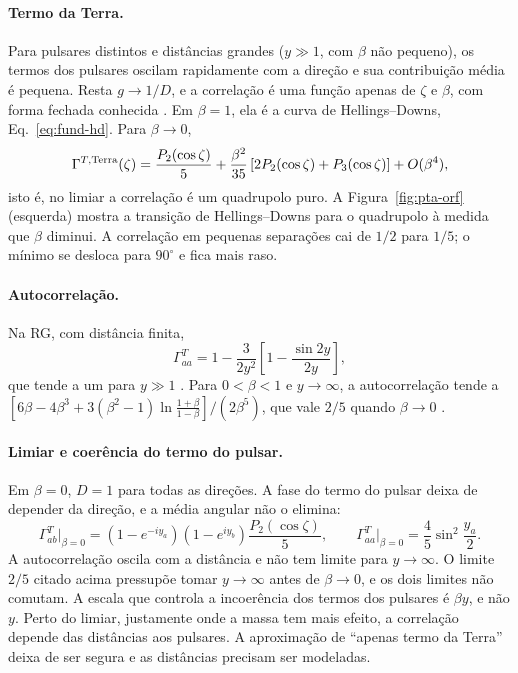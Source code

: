 \paragraph{Termo da Terra.} Para pulsares distintos e distâncias grandes
($y\gg1$, com $\beta$ não pequeno), os termos dos pulsares oscilam
rapidamente com a direção e sua contribuição média é pequena. Resta
$g\to1/D$, e a correlação é uma função apenas de $\zeta$ e $\beta$, com
forma fechada conhecida \autocite{cordes2025,liang2021}. Em $\beta=1$,
ela é a curva de Hellings--Downs, Eq.~\eqref{eq:fund-hd}. Para
$\beta\to0$,
\begin{equation}
 \Gamma^{T,\rm Terra}(\zeta)=\frac{P_2(\cos\zeta)}{5}
 +\frac{\beta^2}{35}\left[2P_2(\cos\zeta)+P_3(\cos\zeta)\right]
 +O(\beta^4),
 \label{eq:pta-limiar-terra}
\end{equation}
isto é, no limiar a correlação é um quadrupolo puro. A
Figura~\ref{fig:pta-orf} (esquerda) mostra a transição de
Hellings--Downs para o quadrupolo à medida que $\beta$ diminui. A
correlação em pequenas separações cai de $1/2$ para $1/5$; o mínimo se
desloca para $90^\circ$ e fica mais raso.

\paragraph{Autocorrelação.} Na RG, com distância finita,
\begin{equation}
 \Gamma^{T}_{aa}=1-\frac{3}{2y^2}\left[1-\frac{\sin2y}{2y}\right],
 \label{eq:pta-auto-rg}
\end{equation}
que tende a um para $y\gg1$ \autocite{cordes2025}. Para $0<\beta<1$ e
$y\to\infty$, a autocorrelação tende a
$[6\beta-4\beta^3+3(\beta^2-1)\ln\frac{1+\beta}{1-\beta}]/(2\beta^5)$,
que vale $2/5$ quando $\beta\to0$ \autocite{cordes2025}.

\paragraph{Limiar e coerência do termo do pulsar.} Em $\beta=0$, $D=1$
para todas as direções. A fase do termo do pulsar deixa de depender da
direção, e a média angular não o elimina:
\begin{equation}
 \Gamma^T_{ab}\big|_{\beta=0}
 =\left(1-e^{-iy_a}\right)\left(1-e^{iy_b}\right)\frac{P_2(\cos\zeta)}{5},
 \qquad
 \Gamma^T_{aa}\big|_{\beta=0}=\frac45\sin^2\frac{y_a}{2}.
 \label{eq:pta-limiar-completo}
\end{equation}
A autocorrelação oscila com a distância e não tem limite para
$y\to\infty$. O limite $2/5$ citado acima pressupõe tomar $y\to\infty$
antes de $\beta\to0$, e os dois limites não comutam. A escala que
controla a incoerência dos termos dos pulsares é $\beta y$, e não $y$.
Perto do limiar, justamente onde a massa tem mais efeito, a correlação
depende das distâncias aos pulsares. A aproximação de ``apenas termo da
Terra'' deixa de ser segura e as distâncias precisam ser modeladas.

